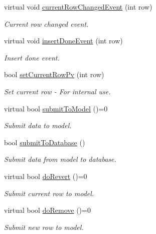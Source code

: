 \begin{DoxyCompactItemize}
virtual void \hyperlink{classmdt_abstract_sql_table_controller_a0625716228187cb42e5c133e2f2780b0}{current\-Row\-Changed\-Event} (int row)
\begin{DoxyCompactList}\small\item\em Current row changed event. \end{DoxyCompactList}\item 
virtual void \hyperlink{classmdt_abstract_sql_table_controller_a844bac90f7693877e17a7a8daafb8958}{insert\-Done\-Event} (int row)
\begin{DoxyCompactList}\small\item\em Insert done event. \end{DoxyCompactList}\item 
bool \hyperlink{classmdt_abstract_sql_table_controller_a2a3e91269bf2d9d0a37b3ff6b428eb2f}{set\-Current\-Row\-Pv} (int row)
\begin{DoxyCompactList}\small\item\em Set current row -\/ For internal use. \end{DoxyCompactList}\item 
virtual bool \hyperlink{classmdt_abstract_sql_table_controller_a0135e032a5bd156485a938fe324193bb}{submit\-To\-Model} ()=0
\begin{DoxyCompactList}\small\item\em Submit data to model. \end{DoxyCompactList}\item 
bool \hyperlink{classmdt_abstract_sql_table_controller_af45fb81b4630134de0816744c44a411a}{submit\-To\-Database} ()
\begin{DoxyCompactList}\small\item\em Submit data from model to database. \end{DoxyCompactList}\item 
virtual bool \hyperlink{classmdt_abstract_sql_table_controller_a7c7eba056561498b7615cbcda6a40695}{do\-Revert} ()=0
\begin{DoxyCompactList}\small\item\em Submit current row to model. \end{DoxyCompactList}\item 
virtual bool \hyperlink{classmdt_abstract_sql_table_controller_a4e44b446a5d24486cfcaea65692a4670}{do\-Remove} ()=0
\begin{DoxyCompactList}\small\item\em Submit new row to model. \end{DoxyCompactList}\end{DoxyCompactItemize}
